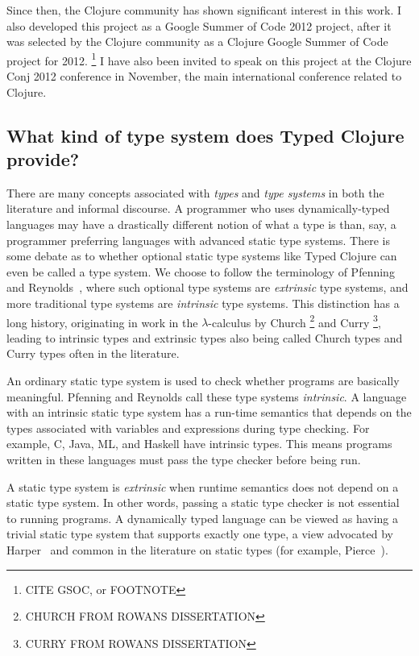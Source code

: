 Since then, the Clojure community has shown significant interest in this work.
I also developed this project as a Google Summer of Code 2012 project,
after it was selected by the Clojure community as a Clojure Google Summer of Code
project for 2012.
\footnote{CITE GSOC, or FOOTNOTE}
I have also been invited to speak on this project at the Clojure Conj
2012 conference in November, the main international conference related to Clojure.

\subsection{What kind of type system does Typed Clojure provide?}


There are many concepts associated with \emph{types} and \emph{type systems} in both the
literature and informal discourse.
A programmer who uses dynamically-typed languages may have a drastically different notion
of what a type is than, say, a programmer preferring languages with advanced static type systems.
There is some debate as to whether optional static type systems like Typed Clojure
can even be called a type system. We choose to
follow the terminology of Pfenning~\cite{Pfe08} and Reynolds~\cite{Rey01},
where such optional type systems are \emph{extrinsic} type systems, and more
traditional type systems are \emph{intrinsic} type systems.
This distinction has a long history, originating in work in the $\lambda$-calculus 
by Church \footnote{CHURCH FROM ROWANS DISSERTATION} and Curry \footnote{CURRY FROM ROWANS DISSERTATION},
leading to intrinsic types and extrinsic types also being called Church types and
Curry types often in the literature.

An ordinary static type system is used to check whether programs are basically
meaningful. Pfenning and Reynolds call these type systems \emph{intrinsic}. A language with an intrinsic
static type system has a run-time semantics that depends on the types associated
with variables and expressions during type checking.
For example, C, Java, ML, and Haskell have intrinsic types.
This means programs written in these languages must pass the type checker before being run.

A static type system is \emph{extrinsic} when runtime semantics
does not depend on a static type system. In other words, passing a static type checker
is not essential to running programs. A dynamically typed language can be viewed
as having a trivial static type system that supports exactly one type,
a view advocated by Harper~\cite{Har12}
and common in the literature on static types (for example, Pierce~\cite{Pie02}).

